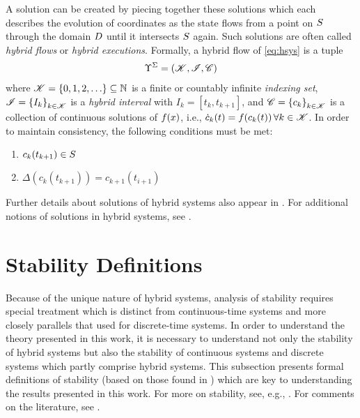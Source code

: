 A solution can be created by piecing together these solutions which each
describes the evolution of coordinates as the state flows from a point on
$S$ through the domain $D$ until it intersects $S$ again.
%
Such solutions are often called {\em hybrid flows} or {\em hybrid executions}.
%
Formally, a hybrid flow of \eqref{eq:hsys} is a tuple
\begin{align*}
  \Upsilon^{\Sigma} = \left( \mathscr{K}, \mathscr{I}, \mathscr{C} \right)
\end{align*}
where $\mathscr{K} = \{0, 1, 2, \ldots\} \subseteq \mathbb{N}$ is a finite or countably
infinite {\em indexing set}, $\mathscr{I} = \left\{I_{k}\right\}_{k \in \mathscr{K}}$ is a {\em
  hybrid interval} with $I_{k} = \left[t_{k}, t_{k+1}\right]$, and $\mathscr{C} =
\left\{c_{k}\right\}_{k \in \mathscr{K}}$ is a collection of continuous solutions of
$f(x)$, i.e., ${\dot c}_{k}(t) = f(c_{k}(t)) \, \forall k \in \mathscr{K}$.
%
In order to maintain consistency, the following conditions must be met:
%
\begin{enumerate}
\item $c_{k}(t_{k+1}) \in S$
\item $\Delta(c_{k}(t_{k+1})) = c_{k+1}(t_{i+1})$
\end{enumerate}

Further details about solutions of hybrid systems also appear in
.
%
For additional notions of solutions in hybrid systems, see \cite{Filippov1988,
  Goebel2009, Haddad2001, Lygeros2003, Ye1998}.


\section{Stability Definitions} \label{sec:hsys-stability}

Because of the unique nature of hybrid systems, analysis of stability requires
special treatment which is distinct from continuous-time systems and more
closely parallels that used for discrete-time systems.
%
In order to understand the theory presented in this work, it is necessary to
understand not only the stability of hybrid systems but also the stability of
continuous systems and discrete systems which partly comprise hybrid systems.
%
This subsection presents formal definitions of stability (based on those found
in \cite[Ch. 4]{Khalil2002}) which are key to understanding the results
presented in this work.
%
For more on stability, see, e.g., \cite{Khalil2002, Teschl2012,
  Vidyasagar1993}.
%
For comments on the literature, see .


